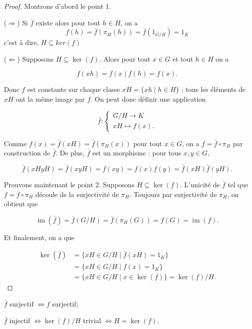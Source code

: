 \begin{proof}
    Montrons d’abord le point 1.

(\(\Rightarrow\))  Si $\bar{f}$ existe alors pour tout $h\in H$, on a
        \[
        f(h)=\bar{f}(\pi_H(h))=\bar{f}(1_{G/H})=1_K
        \]
        c'est à dire, $H\subseteq ker(f)$

(\(\Leftarrow\)) Supposons \( H \subseteq \ker(f) \). Alors pour tout \( x \in G \) et tout \( h \in H \) on a  

\[
f(xh) = f(x) f(h) = f(x).
\]

Donc \( f \) est constante sur chaque classe \( xH = \{xh \mid h \in H\} \) : tous les éléments de \( xH \) ont la même image par \( f \). On peut donc définir une application  

\[
\bar{f} :  
\begin{cases}  
G/H \to K \\  
xH \mapsto f(x).  
\end{cases}  
\]

Comme \( f(x) = \bar{f}(xH) = \bar{f}(\pi_H(x)) \) pour tout \( x \in G \), on a \( f = \bar{f} \circ \pi_H \) par construction de \( \bar{f} \). De plus, \( \bar{f} \) est un morphisme : pour tous \( x, y \in G \),  

\[
\bar{f}(xH yH) = \bar{f}(xyH)  
= f(xy)  
= f(x) f(y)  
= \bar{f}(xH) \bar{f}(yH).
\]

Prouvons maintenant le point 2. Supposons \( H \subseteq \ker(f) \).  
L’unicité de \( \bar{f} \) tel que \( f = \bar{f} \circ \pi_H \) découle de la surjectivité de \( \pi_H \). Toujours par surjectivité de \( \pi_H \), on obtient que  

\[
\operatorname{im}(\bar{f}) = \bar{f}(G/H) = \bar{f}(\pi_H(G)) = f(G) = \operatorname{im}(f).
\]

Et finalement, on a que  

\begin{align}
\ker(\bar{f}) &= \{xH \in G/H \mid \bar{f}(xH)= 1_K\}  \\
              &= \{xH \in G/H \mid f(x) = 1_K\}  \\
              &= \{xH \in G/H \mid x \in \ker(f)\} = \ker(f)/H. 
\end{align}
\end{proof}

\begin{remarque}
     \item $\bar{f}$ surjectif $\Leftrightarrow f$ surjectif;
    \item $\bar{f}$ injectif $\Leftrightarrow \ker(f)/H$ trivial $\Leftrightarrow H = \ker(f)$.
\end{remarque}

